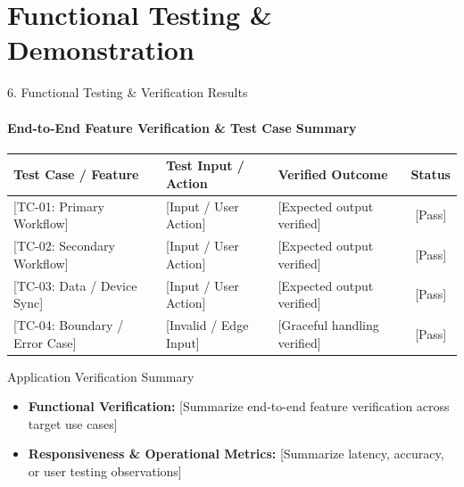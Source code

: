 \documentclass[aspectratio=169, 11pt]{beamer}
\begin{document}
\section{Functional Testing \& Demonstration}

\begin{frame}{6. Functional Testing \& Verification Results}
    \framesubtitle{End-to-End Feature Verification \& Test Case Summary}
    \begin{table}
        \centering
        \footnotesize
        \renewcommand{\arraystretch}{1.25}
        \begin{tabular}{p{3.4cm} p{3.2cm} p{3.6cm} c}
            \toprule
            \textbf{Test Case / Feature} & \textbf{Test Input / Action} & \textbf{Verified Outcome} & \textbf{Status} \\
            \midrule
            {[TC-01: Primary Workflow]} & {[Input / User Action]} & {[Expected output verified]} & {[Pass]} \\
            {[TC-02: Secondary Workflow]} & {[Input / User Action]} & {[Expected output verified]} & {[Pass]} \\
            {[TC-03: Data / Device Sync]} & {[Input / User Action]} & {[Expected output verified]} & {[Pass]} \\
            {[TC-04: Boundary / Error Case]} & {[Invalid / Edge Input]} & {[Graceful handling verified]} & {[Pass]} \\
            \bottomrule
        \end{tabular}
    \end{table}

    \begin{block}{Application Verification Summary}
        \footnotesize
        \begin{itemize}
            \item \textbf{Functional Verification:} {[Summarize end-to-end feature verification across target use cases]}
            \item \textbf{Responsiveness \& Operational Metrics:} {[Summarize latency, accuracy, or user testing observations]}
        \end{itemize}
    \end{block}
\end{frame}
\end{document}
